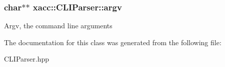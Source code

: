 \subsubsection[{\texorpdfstring{argv}{argv}}]{\setlength{\rightskip}{0pt plus 5cm}char$\ast$$\ast$ xacc\+::\+C\+L\+I\+Parser\+::argv\hspace{0.3cm}{\ttfamily [protected]}}\hypertarget{a00057_aa269b5c9a78f2fe3e4ac48012eb3cc06}{}\label{a00057_aa269b5c9a78f2fe3e4ac48012eb3cc06}
Argv, the command line arguments 

The documentation for this class was generated from the following file\+:\begin{DoxyCompactItemize}
\item 
C\+L\+I\+Parser.\+hpp\end{DoxyCompactItemize}
